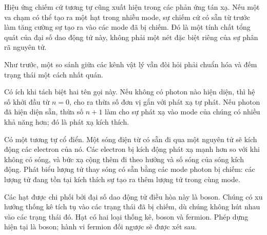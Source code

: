 Hiệu ứng chiếm cứ tương tự cũng xuất hiện trong các phản ứng tán xạ. Nếu một va chạm có thể tạo ra một hạt trong nhiều mode, sự chiếm cứ có sẵn từ trước làm tăng cường sự tạo ra vào các mode đã bị chiếm. Đó là một tính chất tổng quát của đại số dao động tử này, không phải một nét đặc biệt riêng của sự phân rã nguyên tử.

\begin{classroomqa}
\end{classroomqa}

Như trước, một so sánh giữa các kênh vật lý vẫn đòi hỏi phải chuẩn hóa và đếm trạng thái một cách nhất quán.

\begin{classroomqa}
\end{classroomqa}

Có ích khi tách biệt hai tên gọi này. Nếu không có photon nào hiện diện, thì hệ số khởi đầu từ \(n=0\), cho ra thừa số đơn vị gắn với phát xạ tự phát. Nếu photon đã hiện diện sẵn, thừa số \(n+1\) làm cho sự phát xạ vào mode của chúng có nhiều khả năng hơn; đó là phát xạ kích thích.

Có một tương tự cổ điển. Một sóng điện từ có sẵn đi qua một nguyên tử sẽ kích động các electron của nó. Các electron bị kích động phát xạ mạnh hơn so với khi không có sóng, và bức xạ cộng thêm đi theo hướng và số sóng của sóng kích động. Phát biểu lượng tử thay sóng có sẵn bằng các mode photon bị chiếm: các lượng tử đang tồn tại kích thích sự tạo ra thêm lượng tử trong cùng mode.

Các hạt được chi phối bởi đại số dao động tử điều hòa này là boson. Chúng có xu hướng thống kê tích tụ vào các trạng thái đã bị chiếm, dù chúng không hút nhau vào các trạng thái đó. Hạt có hai loại thống kê, boson và fermion. Phép dựng hiện tại là boson; hành vi fermion đối ngược sẽ được xét sau.

